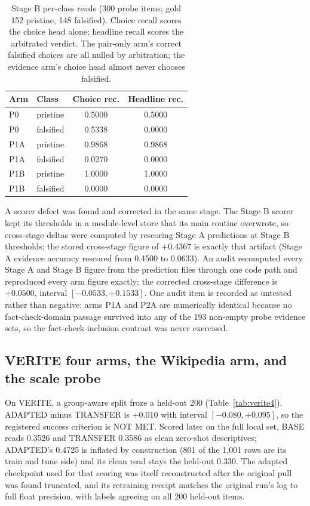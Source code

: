 \documentclass[conference]{IEEEtran}
\begin{document}
\begin{table}[t]
\centering
\caption{Stage B per-class reads (300 probe items; gold 152 pristine, 148 falsified). Choice recall scores the choice head alone; headline recall scores the arbitrated verdict. The pair-only arm's correct falsified choices are all nulled by arbitration; the evidence arm's choice head almost never chooses falsified.}
\label{tab:stagebclass}
\begin{tabular}{llcc}
\toprule
Arm & Class & Choice rec. & Headline rec. \\
\midrule
P0 & pristine & 0.5000 & 0.5000 \\
P0 & falsified & 0.5338 & 0.0000 \\
P1A & pristine & 0.9868 & 0.9868 \\
P1A & falsified & 0.0270 & 0.0000 \\
P1B & pristine & 1.0000 & 1.0000 \\
P1B & falsified & 0.0000 & 0.0000 \\
\bottomrule
\end{tabular}
\end{table}

A scorer defect was found and corrected in the same stage. The Stage B scorer kept its thresholds in a module-level store that its main routine overwrote, so cross-stage deltas were computed by rescoring Stage A predictions at Stage B thresholds; the stored cross-stage figure of $+0.4367$ is exactly that artifact (Stage A evidence accuracy rescored from 0.4500 to 0.0633). An audit recomputed every Stage A and Stage B figure from the prediction files through one code path and reproduced every arm figure exactly; the corrected cross-stage difference is $+0.0500$, interval $[-0.0533, +0.1533]$. One audit item is recorded as untested rather than negative: arms P1A and P2A are numerically identical because no fact-check-domain passage survived into any of the 193 non-empty probe evidence sets, so the fact-check-inclusion contrast was never exercised.

\subsection{VERITE four arms, the Wikipedia arm, and the scale probe}

On VERITE, a group-aware split froze a held-out 200 (Table~\ref{tab:verite4}). ADAPTED minus TRANSFER is $+0.010$ with interval $[-0.080, +0.095]$, so the registered success criterion is NOT MET. Scored later on the full local set, BASE reads 0.3526 and TRANSFER 0.3586 as clean zero-shot descriptives; ADAPTED's 0.4725 is inflated by construction (801 of the 1,001 rows are its train and tune side) and its clean read stays the held-out 0.330. The adapted checkpoint used for that scoring was itself reconstructed after the original pull was found truncated, and its retraining receipt matches the original run's log to full float precision, with labels agreeing on all 200 held-out items.
\end{document}
